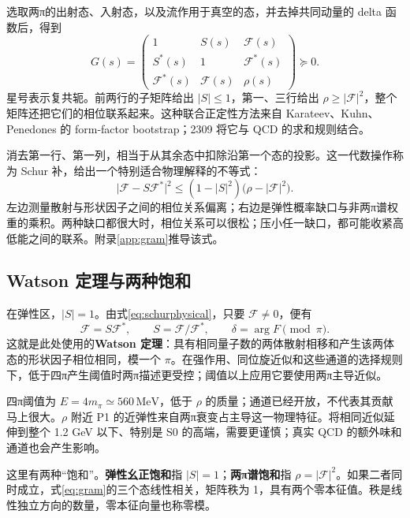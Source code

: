\documentclass[UTF8,a4paper,11pt,fontset=fandol]{ctexart}
\numberwithin{equation}{section}
\newcommand{\MeV}{\,\mathrm{MeV}}
\newcommand{\Fcal}{\mathcal F}
\begin{document}
选取两π的出射态、入射态，以及流作用于真空的态，并去掉共同动量的 delta 函数后，得到
\begin{equation}\label{eq:gram}
G(s)=\begin{pmatrix}
1&S(s)&\Fcal(s)\\
S^*(s)&1&\Fcal^*(s)\\
\Fcal^*(s)&\Fcal(s)&\rho(s)
\end{pmatrix}\succeq0.
\end{equation}
星号表示复共轭。前两行的子矩阵给出 \(|S|\le1\)，第一、三行给出 \(\rho\ge|\Fcal|^2\)，整个矩阵还把它们的相位联系起来。这种联合正定性方法来自 Karateev、Kuhn、Penedones 的 form-factor bootstrap；2309 将它与 QCD 的求和规则结合。\cite{kkp,hk23}

消去第一行、第一列，相当于从其余态中扣除沿第一个态的投影。这一代数操作称为 Schur 补，给出一个特别适合物理解释的不等式：
\begin{equation}\label{eq:schurphysical}
\big|\Fcal-S\Fcal^*\big|^2
\le (1-|S|^2)\big(\rho-|\Fcal|^2\big).
\end{equation}
左边测量散射与形状因子之间的相位关系偏离；右边是弹性概率缺口与非两π谱权重的乘积。两种缺口都很大时，相位关系可以很松；压小任一缺口，都可能收紧高低能之间的联系。附录\ref{app:gram}推导该式。

\subsection{Watson 定理与两种饱和}
在弹性区，\(|S|=1\)。由式\eqref{eq:schurphysical}，只要 \(\Fcal\neq0\)，便有
\begin{equation}\label{eq:watson}
\Fcal=S\Fcal^*,\qquad S=\Fcal/\Fcal^*,\qquad
\delta=\arg F\pmod\pi.
\end{equation}
这就是此处使用的\textbf{Watson 定理}：具有相同量子数的两体散射相移和产生该两体态的形状因子相位相同，模一个 \(\pi\)。在强作用、同位旋近似和这些通道的选择规则下，低于四π产生阈值时两π描述更受控；阈值以上应用它要使用两π主导近似。

四π阈值为 \(E=4m_\pi\simeq560\MeV\)，低于 \(\rho\) 的质量；通道已经开放，不代表其贡献马上很大。\(\rho\) 附近 P1 的近弹性来自两π衰变占主导这一物理特征。将相同近似延伸到整个 1.2 GeV 以下、特别是 S0 的高端，需要更谨慎；真实 QCD 的额外味和通道也会产生影响。

这里有两种“饱和”。\textbf{弹性幺正饱和}指 \(|S|=1\)；\textbf{两π谱饱和}指 \(\rho=|\Fcal|^2\)。如果二者同时成立，式\eqref{eq:gram}的三个态线性相关，矩阵秩为 1，具有两个零本征值。秩是线性独立方向的数量，零本征向量也称零模。
\end{document}
